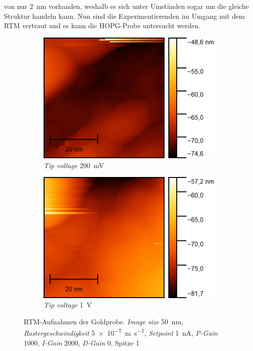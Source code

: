 von nur \SI{2}{\nano \meter} vorhanden, weshalb es sich unter Umständen sogar um die gleiche Struktur handeln kann. Nun sind die Experimentierenden im Umgang mit dem RTM vertraut und
es kann die HOPG-Probe untersucht werden.
\begin{figure}[H]
    \centering
    \begin{subfigure}{0.45\textwidth}
        \centering
        \includegraphics[width=\linewidth]{../figs/Gold10476}
        \caption{\textit{Tip voltage} \SI{200}{\milli \volt}}
    \end{subfigure}
    \begin{subfigure}{0.45\textwidth}
        \centering
        \includegraphics[width=\linewidth]{../figs/Gold10479}
        \caption{\textit{Tip voltage} \SI{1}{\volt}}
    \end{subfigure}
    \caption{RTM-Aufnahmen der Goldprobe. \textit{Image size} \SI{50}{\nano \meter}, \textit{Rastergeschwindigkeit} \SI{5e-7}{\meter \per \second}, \textit{Setpoint} \SI{1}{\nano \ampere},
    \textit{P-Gain} \num{1000}, \textit{I-Gain} \num{2000}, \textit{D-Gain} \num{0}, Spitze 1}\label{fig:gold4}
\end{figure}
